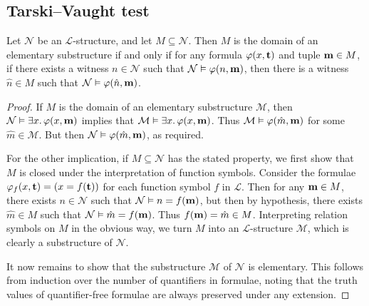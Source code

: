 \subsection{Tarski--Vaught test}
\begin{proposition}
    Let \( \mathcal N \) be an \( \mathcal L \)-structure, and let \( M \subseteq \mathcal N \).
    Then \( M \) is the domain of an elementary substructure if and only if for any formula \( \varphi(x, \vb t) \) and tuple \( \vb m \in M \), if there exists a witness \( n \in \mathcal N \) such that \( \mathcal N \vDash \varphi(n, \vb m) \), then there is a witness \( \hat n \in M \) such that \( \mathcal N \vDash \varphi(\hat n, \vb m) \).
\end{proposition}
\begin{proof}
    If \( M \) is the domain of an elementary substructure \( \mathcal M \), then \( \mathcal N \vDash \exists x.\, \varphi(x, \vb m) \) implies that \( \mathcal M \vDash \exists x.\, \varphi(x, \vb m) \).
    Thus \( \mathcal M \vDash \varphi(\hat m, \vb m) \) for some \( \hat m \in \mathcal M \).
    But then \( \mathcal N \vDash \varphi(\hat m, \vb m) \), as required.

    For the other implication, if \( M \subseteq \mathcal N \) has the stated property, we first show that \( M \) is closed under the interpretation of function symbols.
    Consider the formulae \( \varphi_f(x, \vb t) = (x = f(\vb t)) \) for each function symbol \( f \) in \( \mathcal L \).
    Then for any \( \vb m \in M \), there exists \( n \in \mathcal N \) such that \( \mathcal N \vDash n = f(\vb m) \), but then by hypothesis, there exists \( \hat m \in M \) such that \( \mathcal N \vDash \hat m = f(\vb m) \).
    Thus \( f(\vb m) = \hat m \in M \).
    Interpreting relation symbols on \( M \) in the obvious way, we turn \( M \) into an \( \mathcal L \)-structure \( \mathcal M \), which is clearly a substructure of \( \mathcal N \).

    It now remains to show that the substructure \( \mathcal M \) of \( \mathcal N \) is elementary.
    This follows from induction over the number of quantifiers in formulae, noting that the truth values of quantifier-free formulae are always preserved under any extension.
\end{proof}

